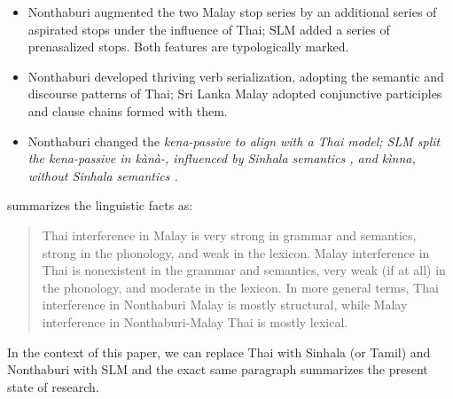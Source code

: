 \documentclass[a4paper,10pt]{article}
\begin{document}
\begin{itemize}
 \item Nonthaburi augmented the two Malay stop series by an additional series of aspirated stops under the influence of Thai; SLM added a series of prenasalized stops. Both features are typologically marked.
 \item Nonthaburi developed thriving verb serialization, adopting the semantic and discourse patterns of Thai; Sri Lanka Malay adopted conjunctive participles and clause chains formed with them.
 \item Nonthaburi changed the \em kena\em-passive to align with a Thai model; SLM split the \em kena\em-passive in \em kànà-\em, influenced by Sinhala semantics \citep[407]{Nordhoff2009phd}, and \em kìnna\em, without Sinhala semantics \citep[187ff]{Nordhoff2009phd}.
\end{itemize}

\citet[322-323]{Tadmor1995phd} summarizes the linguistic facts as:

\begin{quote}
 Thai interference in Malay is very strong in grammar and semantics, strong in the phonology, and weak in the lexicon. Malay interference in Thai is nonexistent in the grammar and semantics, very weak (if at all) in the phonology, and moderate in the lexicon. In more general terms, Thai interference in Nonthaburi Malay is mostly structural, while Malay interference in Nonthaburi-Malay Thai is mostly lexical. \citep[322-323]{Tadmor1995phd}
\end{quote}

In the context of this paper, we can replace Thai with Sinhala (or Tamil) and Nonthaburi with SLM and the exact same paragraph summarizes the present state of research.
\end{document}
